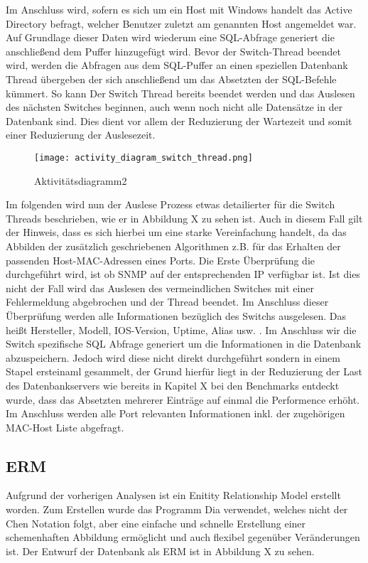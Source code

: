 Im Anschluss wird, sofern es sich um ein Host mit Windows handelt das Active Directory befragt, welcher Benutzer zuletzt am genannten Host angemeldet war. Auf Grundlage dieser Daten wird wiederum eine SQL-Abfrage generiert die anschließend dem Puffer hinzugefügt wird.
Bevor der Switch-Thread beendet wird, werden die Abfragen aus dem SQL-Puffer an einen speziellen Datenbank Thread übergeben der sich anschließend um das Absetzten der SQL-Befehle kümmert. So kann Der Switch Thread bereits beendet werden und das Auslesen des nächsten Switches beginnen, auch wenn noch nicht alle Datensätze in der Datenbank sind. Dies dient vor allem der Reduzierung der Wartezeit und somit einer Reduzierung der Auslesezeit.

\begin{figure}[H]
\centering
\texttt{[image: activity\_diagram\_switch\_thread.png]}
\caption{Aktivitätsdiagramm2}
\label{fig:activitydiagram2}
\end{figure}

Im folgenden wird nun der Auslese Prozess etwas detailierter für die Switch Threads beschrieben, wie er in Abbildung X zu sehen ist. Auch in diesem Fall gilt der Hinweis, dass es sich hierbei um eine starke Vereinfachung handelt, da das Abbilden der zusätzlich geschriebenen Algorithmen z.B. für das Erhalten der passenden Host-MAC-Adressen eines Ports. 
Die Erste Überprüfung die durchgeführt wird, ist ob SNMP auf der entsprechenden IP verfügbar ist. Ist dies nicht der Fall wird das Auslesen des vermeindlichen Switches mit einer Fehlermeldung abgebrochen und der Thread beendet. Im Anschluss dieser Überprüfung werden alle Informationen bezüglich des Switchs ausgelesen. Das heißt Hersteller, Modell, IOS-Version, Uptime, Alias usw. . Im Anschluss wir die Switch spezifische SQL Abfrage generiert um die Informationen in die Datenbank abzuspeichern. Jedoch wird diese nicht direkt durchgeführt sondern in einem Stapel ersteinaml gesammelt, der Grund hierfür liegt in der Reduzierung der Last des Datenbankservers wie bereits in Kapitel X bei den Benchmarks entdeckt wurde, dass das Absetzten mehrerer Einträge auf einmal die Performence erhöht.
Im Anschluss werden alle Port relevanten Informationen inkl. der zugehörigen MAC-Host Liste abgefragt.

\subsection{ERM}
\label{subsec:erm-diagram}

Aufgrund der vorherigen Analysen ist ein Enitity Relationship Model erstellt
worden. Zum Erstellen wurde das Programm Dia verwendet, welches nicht der Chen
Notation folgt, aber eine einfache und schnelle Erstellung einer schemenhaften Abbildung ermöglicht und auch flexibel gegenüber Veränderungen ist.
Der Entwurf der Datenbank als ERM ist in Abbildung X zu sehen.

